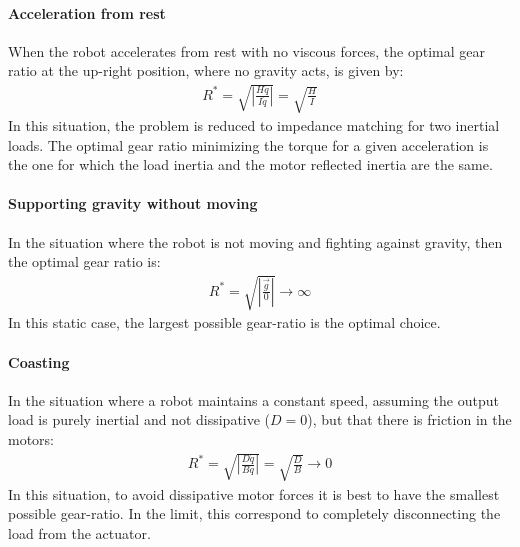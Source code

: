 \paragraph{Acceleration from rest} 

When the robot accelerates from rest with no viscous forces, the optimal gear ratio at the up-right position, where no gravity acts, is given by:
\begin{align}
	R^{*}  = \sqrt{ \left | \frac{H \ddot{q} }{ I \ddot{q} } \right |   } = \sqrt{ \frac{H}{I}}
 \label{eq:impmatching}
\end{align}
In this situation, the problem is reduced to impedance matching for two inertial loads. The optimal gear ratio minimizing the torque for a given acceleration is the one for which the load inertia and the motor reflected inertia are the same.

\paragraph{Supporting gravity without moving}

In the situation where the robot is not moving and fighting against gravity, then the optimal gear ratio is:
\begin{align}
	R^{*}  = \sqrt{ \left | \frac{ \vec{g} }{ 0 } \right |   } \rightarrow \infty
 \label{eq:gravrejection}
\end{align}
In this static case, the largest possible gear-ratio is the optimal choice. 


\paragraph{Coasting} 

In the situation where a robot maintains a constant speed, assuming the output load is purely inertial and not dissipative ($D=0$), but that there is friction in the motors:
%
\begin{align}
	R^{*}  = \sqrt{ \left | \frac{D \dot{q} }{ B \dot{q} } \right |   } = \sqrt{ \frac{D}{B}} \rightarrow 0
 \label{eq:impmatching}
\end{align}
%
In this situation, to avoid dissipative motor forces it is best to have the smallest possible gear-ratio. In the limit, this correspond to completely disconnecting the load from the actuator.



